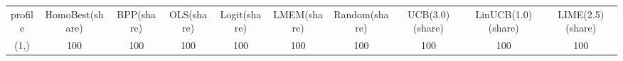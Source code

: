 \begin{tabular}{cccccccccc}
profile & HomoBest(share) & BPP(share) & OLS(share) & Logit(share) & LMEM(share) & Random(share) & UCB(3.0)(share) & LinUCB(1.0)(share) & LIME(2.5)(share)\\
(1,) & 100 & 100 & 100 & 100 & 100 & 100 & 100 & 100 & 100\\
\end{tabular}
